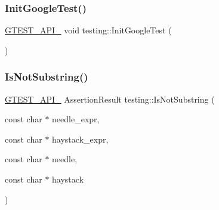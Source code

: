 \mbox{\label{namespacetesting_a2201e3fba11205a7edc2418fae82523e}} 
\subsubsection{\texorpdfstring{Init\+Google\+Test()}{InitGoogleTest()}\hspace{0.1cm}{\footnotesize\ttfamily [3/3]}}
{\footnotesize\ttfamily \hyperlink{gtest-port_8h_aa73be6f0ba4a7456180a94904ce17790}{G\+T\+E\+S\+T\+\_\+\+A\+P\+I\+\_\+} void testing\+::\+Init\+Google\+Test (\begin{DoxyParamCaption}{ }\end{DoxyParamCaption})}

\mbox{\label{namespacetesting_ab553b649b06ef2339cbd90f8dfa119f0}} 
\subsubsection{\texorpdfstring{Is\+Not\+Substring()}{IsNotSubstring()}\hspace{0.1cm}{\footnotesize\ttfamily [1/3]}}
{\footnotesize\ttfamily \hyperlink{gtest-port_8h_aa73be6f0ba4a7456180a94904ce17790}{G\+T\+E\+S\+T\+\_\+\+A\+P\+I\+\_\+} Assertion\+Result testing\+::\+Is\+Not\+Substring (\begin{DoxyParamCaption}\item[{const char $\ast$}]{needle\+\_\+expr,  }\item[{const char $\ast$}]{haystack\+\_\+expr,  }\item[{const char $\ast$}]{needle,  }\item[{const char $\ast$}]{haystack }\end{DoxyParamCaption})}

\mbox{\label{namespacetesting_a28868925c50d541c8568a540b6457e54}} 
